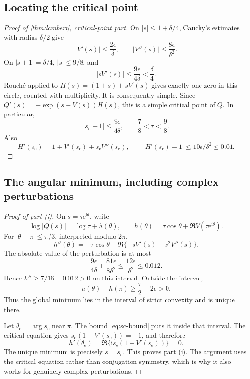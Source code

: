 \documentclass[11pt,a4paper]{article}
\numberwithin{equation}{section}
\theoremstyle{definition}
\theoremstyle{remark}
\newcommand{\e}{\mathrm e}
\newcommand{\ii}{\mathrm i}
\newcommand{\scv}{s_{\mathrm c}}
\begin{document}
\subsection{Locating the critical point}
\begin{proof}[Proof of \cref{thm:lambert}, critical-point part]
On $|s|\leq1+\delta/4$, Cauchy's estimates with radius $\delta/2$ give
\begin{equation}
 |V'(s)|\leq\frac{2\epsilon}{\delta},\qquad
 |V''(s)|\leq\frac{8\epsilon}{\delta^2}.
 \label{eq:cauchyV}
\end{equation}
On $|s+1|=\delta/4$, $|s|\leq9/8$, and
\[
 |sV'(s)|\leq\frac{9\epsilon}{4\delta}<\frac\delta4.
\]
Rouch\'e applied to $H(s)=(1+s)+sV'(s)$ gives exactly one zero in this circle, counted with multiplicity. It is consequently simple. Since
$Q'(s)=-\exp(s+V(s))H(s)$, this is a simple critical point of $Q$. In particular,
\begin{equation}
 |\scv+1|\leq\frac{9\epsilon}{4\delta},\qquad
 \frac78<\tau<\frac98.
 \label{eq:sc-bound}
\end{equation}
Also
\begin{equation}
 H'(\scv)=1+V'(\scv)+\scv V''(\scv),
 \qquad |H'(\scv)-1|\leq10\epsilon/\delta^2\leq0.01.
 \label{eq:Hprime}
\end{equation}
\end{proof}

\subsection{The angular minimum, including complex perturbations}
\begin{proof}[Proof of part (i)]
On $s=\tau\e^{\ii\theta}$, write
\begin{equation}
 \log|Q(s)|=\log\tau+h(\theta),\qquad
 h(\theta)=\tau\cos\theta+\Re V(\tau\e^{\ii\theta}).
 \label{eq:angular}
\end{equation}
For $|\theta-\pi|\leq\pi/3$, interpreted modulo $2\pi$,
\[
 h''(\theta)=-\tau\cos\theta+
 \Re\{-sV'(s)-s^2V''(s)\}.
\]
The absolute value of the perturbation is at most
\[
 \frac{9\epsilon}{4\delta}+\frac{81\epsilon}{8\delta^2}
 \leq\frac{12\epsilon}{\delta^2}\leq0.012.
\]
Hence $h''\geq7/16-0.012>0$ on this interval. Outside the interval,
\[
 h(\theta)-h(\pi)\geq\frac\tau2-2\epsilon>0.
\]
Thus the global minimum lies in the interval of strict convexity and is unique there.

Let $\theta_{\mathrm c}=\arg\scv$ near $\pi$. The bound \eqref{eq:sc-bound} puts it inside that interval. The critical equation gives $\scv(1+V'(\scv))=-1$, and therefore
\[
 h'(\theta_{\mathrm c})=
 \Re\{\ii\scv(1+V'(\scv))\}=0.
\]
The unique minimum is precisely $s=\scv$. This proves part (i). The argument uses the critical equation rather than conjugation symmetry, which is why it also works for genuinely complex perturbations.
\end{proof}
\end{document}
